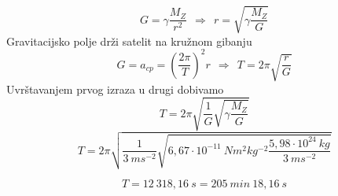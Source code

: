 

$$ G=\gamma \frac{M_Z}{r^2} \ \ \Rightarrow \ \ r=\sqrt{\gamma\frac{M_Z}{G}} $$
Gravitacijsko polje drži satelit na kružnom gibanju
$$ G= a_{cp}= \left( \frac{2\pi}{T} \right)^2 r \ \ \Rightarrow \ \  T=2\pi\sqrt{\frac{r}{G}}$$
Uvrštavanjem prvog izraza u drugi dobivamo
$$ T=2\pi\sqrt{\frac{1}{G} \sqrt{\gamma\frac{M_Z}{G}} }  $$
$$ T=2\pi\sqrt{\frac{1}{3\ ms^{-2}} \sqrt{6,67\cdot  10^{−11}\ Nm^2kg^{−2}
\frac{5,98 \cdot  10^{24}\ kg}{3\ ms^{-2}}} }  $$

$$T = 12\ 318,16\ s=205\ min\ 18,16\ s $$
